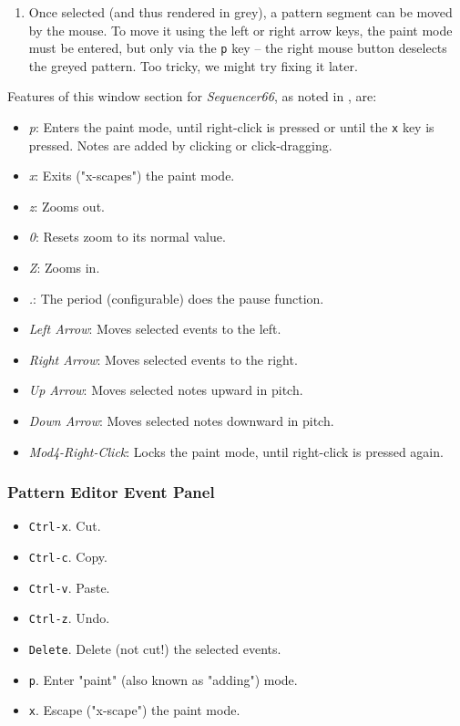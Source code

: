    \begin{enumerate}
      \item Once selected (and thus rendered in grey), a pattern segment
         can be moved by the mouse.  To move it using the left or right
         arrow keys, the paint mode must be entered, but only via the
         \texttt{p} key -- the right mouse button deselects the greyed pattern.
         Too tricky, we might try fixing it later.
   \end{enumerate}

   Features of this window section for \textsl{Sequencer66}, as noted in
   , are:

   \begin{itemize}
      \item \textsl{p}:  Enters the paint mode, until right-click is pressed or
         until the \texttt{x} key is pressed.  Notes are added
         by clicking or click-dragging.
      \item \textsl{x}:  Exits ("x-scapes") the paint mode.
      \item \textsl{z}:  Zooms out.
      \item \textsl{0}:  Resets zoom to its normal value.
      \item \textsl{Z}:  Zooms in.
      \item \textsl{.}:  The period (configurable) does the pause function.
      \item \textsl{Left Arrow}:  Moves selected events to the left.
      \item \textsl{Right Arrow}:  Moves selected events to the right.
      \item \textsl{Up Arrow}:  Moves selected notes upward in pitch.
      \item \textsl{Down Arrow}:  Moves selected notes downward in pitch.
      \item \textsl{Mod4-Right-Click}:  Locks the paint mode, until right-click
         is pressed again.
   \end{itemize}

\subsubsection{Pattern Editor Event Panel}
\label{subsubsec:kbd_mouse_pattern_editor_event_panel}

   \begin{itemize}
      \item \texttt{Ctrl-x}. Cut.
      \item \texttt{Ctrl-c}. Copy.
      \item \texttt{Ctrl-v}. Paste.
      \item \texttt{Ctrl-z}. Undo.
      \item \texttt{Delete}.  Delete (not cut!) the selected events.
      \item \texttt{p}.  Enter "paint" (also known as "adding") mode.
      \item \texttt{x}.  Escape ("x-scape") the paint mode.
   \end{itemize}

